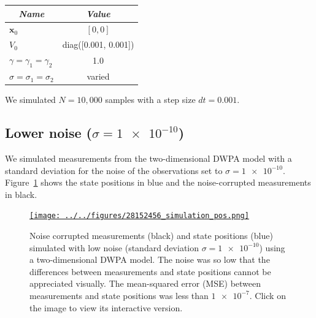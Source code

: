 \documentclass[12pt]{article}
\begin{document}
\begin{center}
    \begin{tabular}{|l|c|}\hline
        \multicolumn{1}{|c|}{\emph{Name}} & \multicolumn{1}{|c|}{\emph{Value}} \\\hline\hline
        $\mathbf{x}_0$                        & $[0, 0]$\\\hline
        $V_0$                                 & diag([0.001, 0.001])\\\hline
        $\gamma=\gamma_1=\gamma_2$            & 1.0\\\hline
        $\sigma=\sigma_1=\sigma_2$            & varied\\\hline
    \end{tabular}
\end{center}

\noindent We simulated $N=10,000$ samples with a step size $dt=0.001$.

\subsection{Lower noise ($\sigma=\num{1e-10}$)}

We simulated measurements from the two-dimensional DWPA model with a standard
deviation for the noise of the observations set to $\sigma=\num{1e-10}$.
Figure~\ref{fig:simulations_low_noise} shows the state positions in blue and
the noise-corrupted measurements in black.

\begin{figure}

    \centering
    \href{http://www.gatsby.ucl.ac.uk/~rapela/fwg/lds_repo/inference/figures/28152456_simulation_pos.html}{\texttt{[image: ../../figures/28152456\_simulation\_pos.png]}}

    \caption{Noise corrupted measurements (black) and state positions
    (blue) simulated with low noise (standard deviation $\sigma=\num{1e-10}$)
    using a two-dimensional DWPA model. The noise was so low that the
    differences between measurements and state positions cannot be appreciated
    visually.  The mean-squared error (MSE) between measurements and state
    positions was less than $\num{1e-7}$. Click on the image to view its
    interactive version.}

        \label{fig:simulations_low_noise}

\end{figure}
\end{document}
